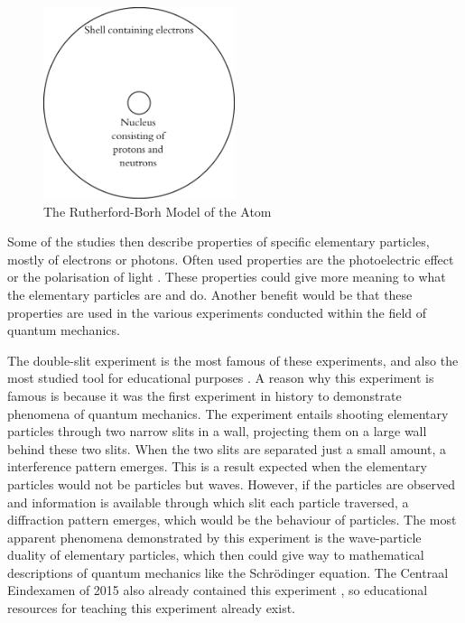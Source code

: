 \documentclass[11pt,twoside]{report} %
\begin{document}
\begin{figure}[h!]
\centering
\includegraphics[width=0.5\textwidth]{bohrmodel}
\caption{The Rutherford-Borh Model of the Atom}
\label{fig:bohrmodel}
\end{figure}

Some of the studies \cite{erduran, hubber, muller, thacker} then describe properties of specific elementary particles, mostly of electrons or photons. Often used properties are the photoelectric effect or the polarisation of light \cite{henriksen, mckagan, muller}. These properties could give more meaning to what the elementary particles are and do. Another benefit would be that these properties are used in the various experiments conducted within the field of quantum mechanics.

The double-slit experiment is the most famous of these experiments, and also the most studied tool for educational purposes \cite{asikainen, henriksen, hobson, levrini, mckagan, muller, papaphotis1,singh2, thacker}. A reason why this experiment is famous is because it was the first experiment in history to demonstrate phenomena of quantum mechanics. The experiment entails shooting elementary particles through two narrow slits in a wall, projecting them on a large wall behind these two slits. When the two slits are separated just a small amount, a interference pattern emerges. This is a result expected when the elementary particles would not be particles but waves. However, if the particles are observed and information is available through which slit each particle traversed, a diffraction pattern emerges, which would be the behaviour of particles. The most apparent phenomena demonstrated by this experiment is the wave-particle duality of elementary particles, which then could give way to mathematical descriptions of quantum mechanics like the Schrödinger equation. The Centraal Eindexamen of 2015 also already contained this experiment \cite{eindexamen2015}, so educational resources for teaching this experiment already exist.
\end{document}
